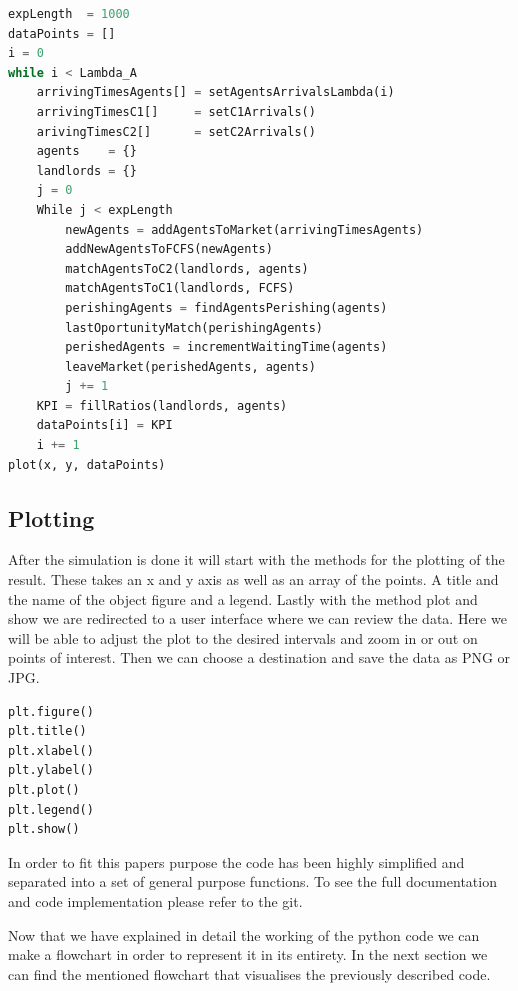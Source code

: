 \begin{lstlisting}[language=Python]
expLength  = 1000
dataPoints = []
i = 0
while i < Lambda_A
    arrivingTimesAgents[] = setAgentsArrivalsLambda(i)
    arrivingTimesC1[]     = setC1Arrivals()
    arivingTimesC2[]      = setC2Arrivals()
    agents    = {}
    landlords = {}
    j = 0
    While j < expLength 
        newAgents = addAgentsToMarket(arrivingTimesAgents)
        addNewAgentsToFCFS(newAgents)
        matchAgentsToC2(landlords, agents)
        matchAgentsToC1(landlords, FCFS)
        perishingAgents = findAgentsPerishing(agents)
        lastOportunityMatch(perishingAgents)
        perishedAgents = incrementWaitingTime(agents)
        leaveMarket(perishedAgents, agents)
        j += 1
    KPI = fillRatios(landlords, agents)
    dataPoints[i] = KPI
    i += 1
plot(x, y, dataPoints)
\end{lstlisting}



\subsection{Plotting}

After the simulation is done it will start with the methods for the plotting of the result. These takes an x and y axis as well as an array of the points. A title and the name of the object figure and a legend. Lastly with the method plot and show we are redirected to a user interface where we can review the data. Here we will be able to adjust the plot to the desired intervals and zoom in or out on points of interest. Then we can choose a destination and save the data as PNG or JPG.

\begin{lstlisting}[language=Python]
plt.figure()
plt.title()
plt.xlabel()
plt.ylabel()
plt.plot()
plt.legend()
plt.show()
\end{lstlisting}

In order to fit this papers purpose the code has been highly simplified and separated into a set of general purpose functions. To see the full documentation and code implementation please refer to the git.

Now that we have explained in detail the working of the python code we can make a flowchart in order to represent it in its entirety. In the next section we can find the mentioned flowchart that visualises the previously described code. 

\newpage
